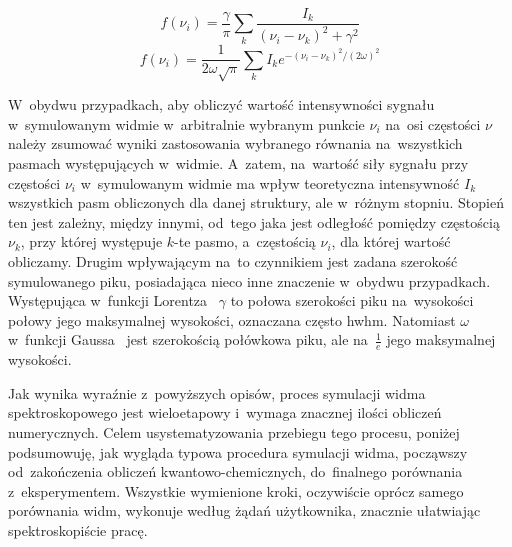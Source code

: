 \begin{equation}\label{eq:lorentz}
  f(\nu_i) = \frac{\gamma}{\pi}\sum\limits_k\frac{I_k}{(\nu_i - \nu_k)^2 + \gamma^2}
\end{equation}
\begin{equation}\label{eq:gauss}
  f(\nu_i) = \frac{1}{2\omega\sqrt{\pi}}\sum\limits_k I_k e^{-(\nu_i - \nu_k)^2 / (2\omega)^2}
\end{equation}

W~obydwu przypadkach, aby obliczyć wartość intensywności sygnału w~symulowanym widmie w~arbitralnie
  wybranym punkcie $\nu_i$ na~osi częstości $\nu$ należy zsumować wyniki zastosowania wybranego
  równania na~wszystkich pasmach występujących w~widmie.
A~zatem, na~wartość siły sygnału przy częstości $\nu_i$ w~symulowanym widmie ma wpływ teoretyczna
  intensywność $I_k$ wszystkich pasm obliczonych dla danej struktury, ale w~różnym stopniu.
Stopień ten jest zależny, między innymi, od~tego jaka jest odległość pomiędzy częstością $\nu_k$,
  przy której występuje $k$-te pasmo, a~częstością $\nu_i$, dla której wartość obliczamy.
Drugim wpływającym na~to czynnikiem jest zadana szerokość symulowanego piku, posiadająca nieco
  inne znaczenie w~obydwu przypadkach.
Występująca w~funkcji Lorentza~ $\gamma$ to połowa szerokości piku
  na~wysokości połowy jego maksymalnej wysokości, oznaczana często \acrshort{hwhm}.
Natomiast $\omega$ w~funkcji Gaussa~ jest szerokością połówkowa piku, ale na~$\frac{1}{e}$ jego maksymalnej wysokości.

Jak wynika wyraźnie z~powyższych opisów, proces symulacji widma spektroskopowego jest wieloetapowy
  i~wymaga znacznej ilości obliczeń numerycznych.
Celem usystematyzowania przebiegu tego procesu, poniżej podsumowuję, jak wygląda typowa procedura
  symulacji widma, począwszy od~zakończenia obliczeń kwantowo-chemicznych,
  do~finalnego porównania z~eksperymentem.
Wszystkie wymienione kroki, oczywiście oprócz samego porównania widm, \tesliper{} wykonuje według
  żądań użytkownika, znacznie ułatwiając spektroskopiście pracę.

